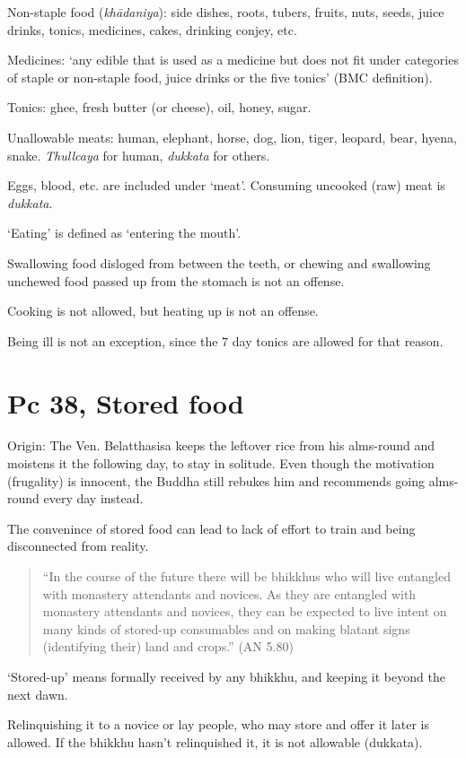Non-staple food (\emph{khādaniya}): side dishes, roots, tubers, fruits,
nuts, seeds, juice drinks, tonics, medicines, cakes, drinking conjey,
etc.

Medicines: `any edible that is used as a medicine but does not fit under
categories of staple or non-staple food, juice drinks or the five
tonics' (BMC definition).

Tonics: ghee, fresh butter (or cheese), oil, honey, sugar.

Unallowable meats: human, elephant, horse, dog, lion, tiger, leopard,
bear, hyena, snake. \emph{Thullcaya} for human, \emph{dukkata} for
others.

Eggs, blood, etc. are included under `meat'. Consuming uncooked (raw)
meat is \emph{dukkata}.

`Eating' is defined as `entering the mouth'.

Swallowing food disloged from between the teeth, or chewing and
swallowing unchewed food passed up from the stomach is not an offense.

Cooking is not allowed, but heating up is not an offense.

Being ill is not an exception, since the 7 day tonics are allowed for
that reason.

\section{Pc 38, Stored food}

Origin: The Ven. Belatthasisa keeps the leftover rice from his
alms-round and moistens it the following day, to stay in solitude. Even
though the motivation (frugality) is innocent, the Buddha still rebukes
him and recommends going alms-round every day instead.

The convenince of stored food can lead to lack of effort to train and
being disconnected from reality.

\begin{quote}
``In the course of the future there will be bhikkhus who will live
entangled with monastery attendants and novices. As they are entangled
with monastery attendants and novices, they can be expected to live
intent on many kinds of stored-up consumables and on making blatant
signs (identifying their) land and crops.'' (AN 5.80)
\end{quote}

`Stored-up' means formally received by any bhikkhu, and keeping it
beyond the next dawn.

Relinquishing it to a novice or lay people, who may store and offer it
later is allowed. If the bhikkhu hasn't relinquished it, it is not
allowable (dukkata).

